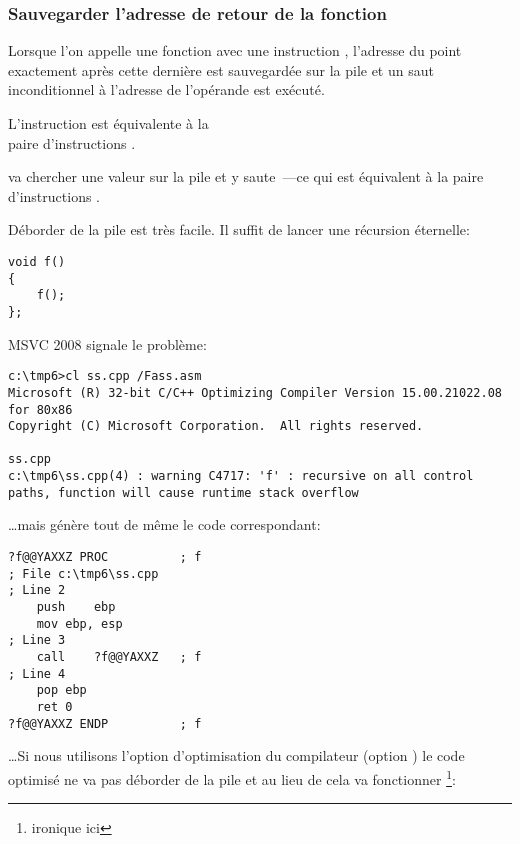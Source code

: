 ﻿\subsubsection{Sauvegarder l'adresse de retour de la fonction}


Lorsque l'on appelle une fonction avec une instruction \CALL, l'adresse du point
exactement après cette dernière est sauvegardée sur la pile et un saut inconditionnel
à l'adresse de l'opérande \CALL est exécuté.

L'instruction \CALL est équivalente à la\\
paire d'instructions .

\RET va chercher une valeur sur la pile et y saute~---ce qui est équivalent à
la paire d'instructions .

\myindex{\Stack!\MLStackOverflow}
\myindex{\Recursion}
Déborder de la pile est très facile. Il suffit de lancer une récursion éternelle:

\begin{lstlisting}[style=customc]
void f()
{
	f();
};
\end{lstlisting}

MSVC 2008 signale le problème:

\begin{lstlisting}
c:\tmp6>cl ss.cpp /Fass.asm
Microsoft (R) 32-bit C/C++ Optimizing Compiler Version 15.00.21022.08 for 80x86
Copyright (C) Microsoft Corporation.  All rights reserved.

ss.cpp
c:\tmp6\ss.cpp(4) : warning C4717: 'f' : recursive on all control paths, function will cause runtime stack overflow
\end{lstlisting}

\dots mais génère tout de même le code correspondant:

\begin{lstlisting}[style=customasmx86]
?f@@YAXXZ PROC			; f
; File c:\tmp6\ss.cpp
; Line 2
	push	ebp
	mov	ebp, esp
; Line 3
	call	?f@@YAXXZ	; f
; Line 4
	pop	ebp
	ret	0
?f@@YAXXZ ENDP			; f
\end{lstlisting}

\dots Si nous utilisons l'option d'optimisation du compilateur (option \TT{\Ox})
le code optimisé ne va pas déborder de la pile et au lieu de cela va fonctionner
\footnote{ironique ici}:

